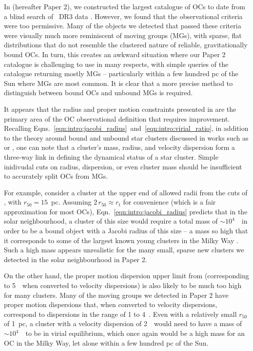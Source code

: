 In \cite{hunt_improving_open_2023} (hereafter Paper 2), we constructed the largest catalogue of OCs to date from a blind search of \gaia\ DR3 data \citep{gaia_collaboration_gaia_2022}. However, we found that the \cite{cantat-gaudin_clusters_2020} observational criteria were too permissive. Many of the objects we detected that passed these criteria were visually much more reminiscent of moving groups (MGs), with sparse, flat distributions that do not resemble the clustered nature of reliable, gravitationally bound OCs. In turn, this creates an awkward situation where our Paper 2 catalogue is challenging to use in many respects, with simple queries of the catalogue returning mostly MGs -- particularly within a few hundred pc of the Sun where MGs are most common. It is clear that a more precise method to distinguish between bound OCs and unbound MGs is required. 

It appears that the radius and proper motion constraints presented in \cite{cantat-gaudin_clusters_2020} are the primary area of the OC observational definition that requires improvement. Recalling Eqns.~\ref{eqn:intro:jacobi_radius}~and~\ref{eqn:intro:virial_ratio}, in addition to the theory around bound and unbound star clusters discussed in works such as \cite{portegies_zwart_young_2010} or \cite{krause_physics_2020}, one can note that a cluster's mass, radius, and velocity dispersion form a three-way link in defining the dynamical status of a star cluster. Simple inidivudal cuts on radius, dispersion, or even cluster mass should be insufficient to accurately split OCs from MGs.

For example, consider a cluster at the upper end of allowed radii from the cuts of \cite{cantat-gaudin_clusters_2020}, with $r_{50}=15$~pc. Assuming $2 \, r_{50}\approx r_t$ for convenience (which is a fair approximation for most OCs), Eqn.~\ref{eqn:intro:jacobi_radius} predicts that in the solar neighbourhood, a cluster of this size would require a total mass of $\sim10^4$~\MSun\ in order to be a bound object with a Jacobi radius of this size -- a mass so high that it corresponds to some of the largest known young clusters in the Milky Way \citep{portegies_zwart_young_2010,cantat-gaudin_milky_2022}. Such a high mass appears unrealistic for the many small, sparse new clusters we detected in the solar neighbourhood in Paper 2. 

On the other hand, the proper motion dispersion upper limit from \cite{cantat-gaudin_clusters_2020} (corresponding to 5~\kms\ when converted to velocity dispersions) is also likely to be much too high for many clusters. Many of the moving groups we detected in Paper 2 have proper motion dispersions that, when converted to velocity dispersions, correspond to dispersions in the range of 1 to 4~\kms. Even with a relatively small $r_{50}$ of 1~pc, a cluster with a velocity dispersion of 2~\kms\ would need to have a mass of $\sim10^4$~\MSun\ to be in virial equilibrium, which once again would be a high mass for an OC in the Milky Way, let alone within a few hundred pc of the Sun. 

